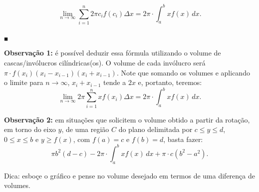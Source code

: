 \documentclass{article}
\begin{document}
{\begin{newpage}
$$\displaystyle{\lim_{n\to\infty } \sum_{i=1}^{n} 2\pi c_{i}f(c_i)\Delta x =  2\pi\cdot\int_{a}^{b}xf(x)\, dx.}$$\begin{flushright} $_{\blacksquare }$ \end{flushright}
\vspace{0.3cm}
\par\textbf{Observação 1:} é possível deduzir essa fórmula utilizando o volume de cascas/invólucros cilíndricas(os). O volume de cada invólucro será $\displaystyle{\pi\cdot f(x_i)(x_i - x_{i-1})(x_i + x_{i-1})}$. Note que somando os volumes e aplicando o limite para $n\rightarrow \infty $, $x_i + x_{i-1}$ tende a $2x$ e, portanto, teremos:
$$\displaystyle{\lim_{n\to\infty } 2\pi\sum_{i=1}^{n}xf(x_i)\Delta x       = 2\pi\cdot\int_{a}^{b}}xf(x)\, dx.$$
\par\textbf{Observação 2:} em situações que solicitem o volume obtido a partir da rotação, em torno do eixo $y$, de uma região $C$ do plano delimitada por $\displaystyle{c\leq y\leq d}$, $\displaystyle{0\leq x\leq b}$ e $\displaystyle{y\geq f(x)}$, com $f(a) = c$ e $f(b)=d$, basta fazer:
$$\displaystyle{\pi b^{2}(d-c) - 2\pi\cdot\int_{a}^{b}xf(x)\, dx + \pi\cdot c(b^{2}-a^{2})}.$$ \begin{center} Dica: esboçe o gráfico e pense no volume desejado em termos de uma diferença de volumes. \end{center}  


\end{newpage}}
\end{document}
